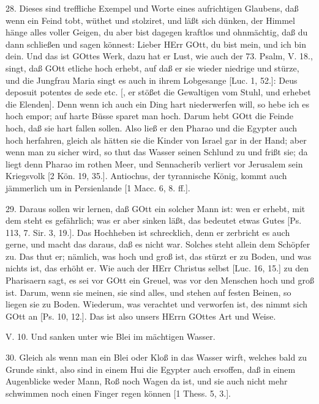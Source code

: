 28. Dieses sind treffliche Exempel und Worte eines aufrichtigen Glaubens, daß wenn ein Feind tobt, wüthet und stolziret, und läßt sich dünken, der Himmel hänge alles voller Geigen, du aber bist dagegen kraftlos und ohnmächtig, daß du dann schließen und sagen könnest: Lieber HErr GOtt, du bist mein, und ich bin dein. Und das ist GOttes Werk, dazu hat er Lust, wie auch der 73. Psalm, V. 18., singt, daß GOtt etliche hoch erhebt, auf daß er sie wieder niedrige und stürze, und die Jungfrau Maria singt es auch in ihrem Lobgesange [Luc. 1, 52.]: Deus deposuit potentes de sede etc. [, er stößet die Gewaltigen vom Stuhl, und erhebet die Elenden]. Denn wenn ich auch ein Ding hart niederwerfen will, so hebe ich es hoch empor; auf harte Büsse sparet man hoch. Darum hebt GOtt die Feinde hoch, daß sie hart fallen sollen. Also ließ er den Pharao und die Egypter auch hoch herfahren, gleich als hätten sie die Kinder von Israel gar in der Hand; aber wenn man zu sicher wird, so thut das Wasser seinen Schlund zu und frißt sie; da liegt denn Pharao im rothen Meer, und Sennacherib verliert vor Jerusalem sein Kriegsvolk [2 Kön. 19, 35.]. Antiochus, der tyrannische König, kommt auch jämmerlich um in Persienlande [1 Macc. 6, 8. ff.].

29. Daraus sollen wir lernen, daß GOtt ein solcher Mann ist: wen er erhebt, mit dem steht es gefährlich; was er aber sinken läßt, das bedeutet etwas Gutes [Ps. 113, 7. Sir. 3, 19.]. Das Hochheben ist schrecklich, denn er zerbricht es auch gerne, und macht das daraus, daß es nicht war. Solches steht allein dem Schöpfer zu. Das thut er; nämlich, was hoch und groß ist, das stürzt er zu Boden, und was nichts ist, das erhöht er. Wie auch der HErr Christus selbst [Luc. 16, 15.] zu den Pharisaern sagt, es sei vor GOtt ein Greuel, was vor den Menschen hoch und groß ist. Darum, wenn sie meinen, sie sind alles, und stehen auf festen Beinen, so liegen sie zu Boden. Wiederum, was verachtet und verworfen ist, des nimmt sich GOtt an [Ps. 10, 12.]. Das ist also unsers HErrn GOttes Art und Weise.

\begin{schriftzitat}
V. 10. Und sanken unter wie Blei im mächtigen Wasser.
\end{schriftzitat}

30. Gleich als wenn man ein Blei oder Kloß in das Wasser wirft, welches bald zu Grunde sinkt, also sind in einem Hui die Egypter auch ersoffen, daß in einem Augenblicke weder Mann, Roß noch Wagen da ist, und sie auch nicht mehr schwimmen noch einen Finger regen können [1 Thess. 5, 3.].


